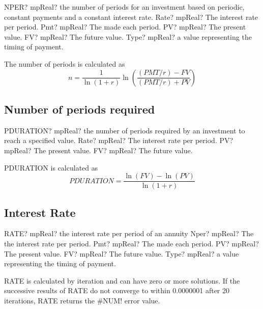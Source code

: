 \begin{mpFunctionsExtract}
	\mpWorksheetFunctionFiveNotImplemented
	{NPER? mpReal? the number of periods for an investment based on periodic, constant payments and a constant interest rate.}
	{Rate? mpReal? The interest rate per period.}
	{Pmt? mpReal? The made each period.}
	{PV? mpReal? The present value.}
	{FV? mpReal? The future value.}
	{Type? mpReal? a value representing the timing of payment.}
\end{mpFunctionsExtract}

\vspace{0.3cm}
The number of periods is calculated as
\begin{equation}
	n = \frac{1}{\ln(1+r)} \ln \left( \frac{(PMT/r)-FV}{(PMT/r)+PV} \right)
\end{equation}




\subsection{Number of periods required}

\begin{mpFunctionsExtract}
	\mpWorksheetFunctionThreeNotImplemented
	{PDURATION? mpReal?  the number of periods required by an investment to reach a specified value.}
	{Rate? mpReal? The interest rate per period.}
	{PV? mpReal? The present value.}
	{FV? mpReal? The future value.}
\end{mpFunctionsExtract}

PDURATION is calculated as
\begin{equation}
	PDURATION = \frac{\ln(FV) - \ln(PV)}{\ln(1+r)} 
\end{equation}



\subsection{Interest Rate}


\begin{mpFunctionsExtract}
	\mpWorksheetFunctionFiveNotImplemented
	{RATE? mpReal? the interest rate per period of an annuity}
	{Nper? mpReal? The the interest rate per period.}
	{Pmt? mpReal? The made each period.}
	{PV? mpReal? The present value.}
	{FV? mpReal? The future value.}
	{Type? mpReal? a value representing the timing of payment.}
\end{mpFunctionsExtract}


\vspace{0.3cm}
RATE is calculated by iteration and can have zero or more solutions. If the successive results of RATE do not converge to within 0.0000001 after 20 iterations, RATE returns the \#NUM! error value.


